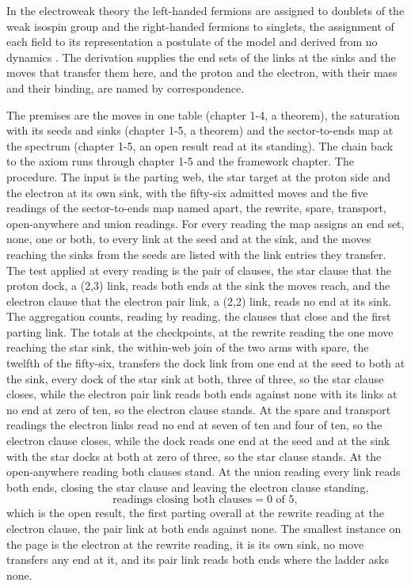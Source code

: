 \begin{chbridge}
In the electroweak theory the left-handed fermions are assigned to doublets of the weak isospin group and the right-handed fermions to singlets, the assignment of each field to its representation a postulate of the model and derived from no dynamics \cite{Glashow1961,Weinberg1967}. The derivation supplies the end sets of the links at the sinks and the moves that transfer them here, and the proton and the electron, with their mass and their binding, are named by correspondence.
\end{chbridge}
\begin{chproof}[finite]
The premises are the moves in one table (chapter 1-4, a theorem), the saturation with its seeds and sinks (chapter 1-5, a theorem) and the sector-to-ends map at the spectrum (chapter 1-5, an open result read at its standing). The chain back to the axiom runs through chapter 1-5 and the framework chapter. The procedure. The input is the parting web, the star target at the proton side and the electron at its own sink, with the fifty-six admitted moves and the five readings of the sector-to-ends map named apart, the rewrite, spare, transport, open-anywhere and union readings. For every reading the map assigns an end set, none, one or both, to every link at the seed and at the sink, and the moves reaching the sinks from the seeds are listed with the link entries they transfer. The test applied at every reading is the pair of clauses, the star clause that the proton dock, a (2,3) link, reads both ends at the sink the moves reach, and the electron clause that the electron pair link, a (2,2) link, reads no end at its sink. The aggregation counts, reading by reading, the clauses that close and the first parting link. The totals at the checkpoints, at the rewrite reading the one move reaching the star sink, the within-web join of the two arms with spare, the twelfth of the fifty-six, transfers the dock link from one end at the seed to both at the sink, every dock of the star sink at both, three of three, so the star clause closes, while the electron pair link reads both ends against none with its links at no end at zero of ten, so the electron clause stands. At the spare and transport readings the electron links read no end at seven of ten and four of ten, so the electron clause closes, while the dock reads one end at the seed and at the sink with the star docks at both at zero of three, so the star clause stands. At the open-anywhere reading both clauses stand. At the union reading every link reads both ends, closing the star clause and leaving the electron clause standing,
\begin{equation}
\text{readings closing both clauses} = 0 \text{ of } 5 ,
\end{equation}
which is the open result, the first parting overall at the rewrite reading at the electron clause, the pair link at both ends against none. The smallest instance on the page is the electron at the rewrite reading, it is its own sink, no move transfers any end at it, and its pair link reads both ends where the ladder asks none.


\end{chproof}
